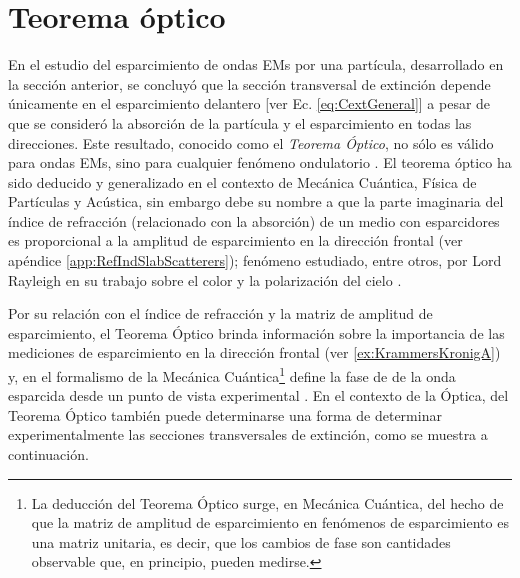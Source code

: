 \section{Teorema óptico}

En el estudio del esparcimiento de ondas EMs por una partícula, desarrollado en la sección anterior, se concluyó que la sección transversal de extinción depende únicamente en el esparcimiento delantero [ver Ec. \eqref{eq:CextGeneral}] a pesar de que se consideró la absorción de la partícula y el esparcimiento en todas las direcciones. Este resultado, conocido como el \textit{Teorema Óptico}, no sólo es válido para ondas EMs, sino para cualquier fenómeno ondulatorio \cite{krasavin2018generalization,newton1976optical}. El teorema óptico ha sido deducido y generalizado en el contexto de Mecánica Cuántica, Física de Partículas y Acústica, sin embargo debe su nombre a que la parte imaginaria del índice de refracción (relacionado con la absorción) de un medio con esparcidores es proporcional a la amplitud de esparcimiento en la dirección frontal \cite{newton1976optical} (ver apéndice \ref{app:RefIndSlabScatterers}); fenómeno estudiado, entre otros, por Lord Rayleigh en su trabajo sobre el color y la polarización del cielo \cite{strutt1871On}.

Por su relación con el índice de refracción y la matriz de amplitud de esparcimiento, el Teorema Óptico brinda información sobre la importancia de las mediciones de esparcimiento en la dirección frontal (ver \ref{ex:KrammersKronigA}) y, en el formalismo de la Mecánica Cuántica\footnote{La deducción del Teorema Óptico surge, en Mecánica Cuántica, del hecho de que la matriz de amplitud de esparcimiento en fenómenos de esparcimiento es una matriz unitaria, es decir, que los cambios de fase son cantidades observable que, en principio, pueden medirse.} define la fase de de la onda esparcida desde un punto de vista experimental \cite{newton1976optical}. En el contexto de la Óptica, del Teorema Óptico también puede determinarse una forma de determinar experimentalmente las secciones transversales de extinción, como se muestra a continuación.

